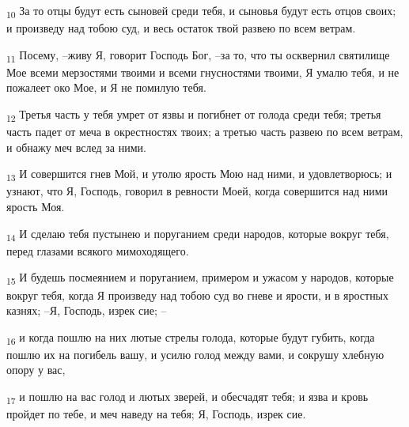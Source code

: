 \begin{tcolorbox}
\textsubscript{10} За то отцы будут есть сыновей среди тебя, и сыновья будут есть отцов своих; и произведу над тобою суд, и весь остаток твой развею по всем ветрам.
\end{tcolorbox}
\begin{tcolorbox}
\textsubscript{11} Посему, --живу Я, говорит Господь Бог, --за то, что ты осквернил святилище Мое всеми мерзостями твоими и всеми гнусностями твоими, Я умалю тебя, и не пожалеет око Мое, и Я не помилую тебя.
\end{tcolorbox}
\begin{tcolorbox}
\textsubscript{12} Третья часть у тебя умрет от язвы и погибнет от голода среди тебя; третья часть падет от меча в окрестностях твоих; а третью часть развею по всем ветрам, и обнажу меч вслед за ними.
\end{tcolorbox}
\begin{tcolorbox}
\textsubscript{13} И совершится гнев Мой, и утолю ярость Мою над ними, и удовлетворюсь; и узнают, что Я, Господь, говорил в ревности Моей, когда совершится над ними ярость Моя.
\end{tcolorbox}
\begin{tcolorbox}
\textsubscript{14} И сделаю тебя пустынею и поруганием среди народов, которые вокруг тебя, перед глазами всякого мимоходящего.
\end{tcolorbox}
\begin{tcolorbox}
\textsubscript{15} И будешь посмеянием и поруганием, примером и ужасом у народов, которые вокруг тебя, когда Я произведу над тобою суд во гневе и ярости, и в яростных казнях; --Я, Господь, изрек сие; --
\end{tcolorbox}
\begin{tcolorbox}
\textsubscript{16} и когда пошлю на них лютые стрелы голода, которые будут губить, когда пошлю их на погибель вашу, и усилю голод между вами, и сокрушу хлебную опору у вас,
\end{tcolorbox}
\begin{tcolorbox}
\textsubscript{17} и пошлю на вас голод и лютых зверей, и обесчадят тебя; и язва и кровь пройдет по тебе, и меч наведу на тебя; Я, Господь, изрек сие.
\end{tcolorbox}
